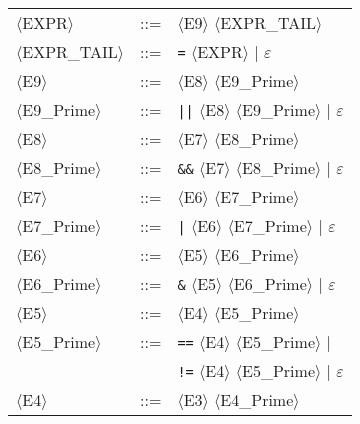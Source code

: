 \begin{footnotesize}
\begin{longtable}{>{\raggedright\arraybackslash}p{4cm}@{\ }>{\raggedright\arraybackslash}p{1.5cm}@{\ }>{\raggedright\arraybackslash}p{8.5cm}}
      $\langle$EXPR$\rangle$ & ::= & $\langle$E9$\rangle$ $\langle$EXPR\_TAIL$\rangle$ \\
      
      $\langle$EXPR\_TAIL$\rangle$ & ::= & \texttt{=} $\langle$EXPR$\rangle$ $\mid$ $\varepsilon$ \\
      
      $\langle$E9$\rangle$ & ::= & $\langle$E8$\rangle$ $\langle$E9\_Prime$\rangle$ \\
      
      $\langle$E9\_Prime$\rangle$ & ::= & \texttt{||} $\langle$E8$\rangle$ $\langle$E9\_Prime$\rangle$ $\mid$ $\varepsilon$ \\
      
      $\langle$E8$\rangle$ & ::= & $\langle$E7$\rangle$ $\langle$E8\_Prime$\rangle$ \\
      
      $\langle$E8\_Prime$\rangle$ & ::= & \texttt{\&\&} $\langle$E7$\rangle$ $\langle$E8\_Prime$\rangle$ $\mid$ $\varepsilon$ \\
      
      $\langle$E7$\rangle$ & ::= & $\langle$E6$\rangle$ $\langle$E7\_Prime$\rangle$ \\
      
      $\langle$E7\_Prime$\rangle$ & ::= & \texttt{|} $\langle$E6$\rangle$ $\langle$E7\_Prime$\rangle$ $\mid$ $\varepsilon$ \\
      
      $\langle$E6$\rangle$ & ::= & $\langle$E5$\rangle$ $\langle$E6\_Prime$\rangle$ \\
      
      $\langle$E6\_Prime$\rangle$ & ::= & \texttt{\&} $\langle$E5$\rangle$ $\langle$E6\_Prime$\rangle$ $\mid$ $\varepsilon$ \\
      
      $\langle$E5$\rangle$ & ::= & $\langle$E4$\rangle$ $\langle$E5\_Prime$\rangle$ \\
      
      $\langle$E5\_Prime$\rangle$ & ::= & \texttt{==} $\langle$E4$\rangle$ $\langle$E5\_Prime$\rangle$ $\mid$ \\
      & & \texttt{!=} $\langle$E4$\rangle$ $\langle$E5\_Prime$\rangle$ $\mid$ $\varepsilon$ \\
      
      $\langle$E4$\rangle$ & ::= & $\langle$E3$\rangle$ $\langle$E4\_Prime$\rangle$ \\
      

\end{longtable}
\end{footnotesize}
